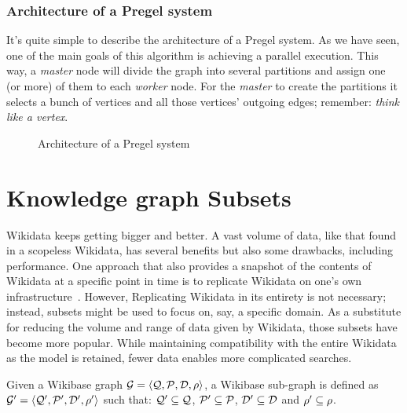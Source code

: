 \subsubsection{Architecture of a Pregel system}

It's quite simple to describe the architecture of a Pregel system. As we have seen, one of the main goals of this algorithm is achieving a parallel execution. This way, a \textit{master} node will divide the graph into several partitions and assign one (or more) of them to each \textit{worker} node. For the \textit{master} to create the partitions it selects a bunch of vertices and all those vertices' outgoing edges; remember: \textit{think like a vertex}.

\begin{figure}[ht]
    \centering
    
    \caption[Architecture of a Pregel system]{Architecture of a Pregel system~\cite{10.1145/3349265}}
    \label{fig:architecture:pregel}
\end{figure}

\section{Knowledge graph Subsets}

Wikidata keeps getting bigger and better. A vast volume of data, like that found in a scopeless Wikidata, has several benefits but also some drawbacks, including performance. One approach that also provides a snapshot of the contents of Wikidata at a specific point in time is to replicate Wikidata on one's own infrastructure~\cite{10.37044/osf.io/wu9et}. However, Replicating Wikidata in its entirety is not necessary; instead, subsets might be used to focus on, say, a specific domain. As a substitute for reducing the volume and range of data given by Wikidata, those subsets have become more popular. While maintaining compatibility with the entire Wikidata as the model is retained, fewer data enables more complicated searches.

\begin{definition}
    Given a Wikibase graph $\mathcal{G}=\langle\mathcal{Q},\mathcal{P},\mathcal{D},\rho\rangle$, a Wikibase sub-graph is defined as  $\mathcal{G}'=\langle\mathcal{Q}',\mathcal{P}',\mathcal{D}',\rho'\rangle$ such that: $\mathcal{Q}'\subseteq\mathcal{Q}$, $\mathcal{P}'\subseteq\mathcal{P}$, $\mathcal{D}'\subseteq\mathcal{D}$ and $\rho'\subseteq\rho$.
\end{definition}

